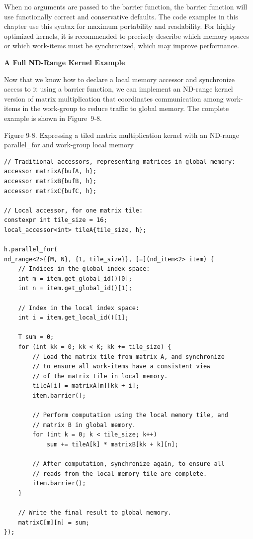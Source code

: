 When no arguments are passed to the barrier function, the barrier function will use functionally correct and conservative defaults. The code examples in this chapter use this syntax for maximum portability and readability. For highly optimized kernels, it is recommended to precisely describe which memory spaces or which work-items must be synchronized, which may improve performance.\par

\hspace*{\fill} \par %
\textbf{A Full ND-Range Kernel Example}

Now that we know how to declare a local memory accessor and synchronize access to it using a barrier function, we can implement an ND-range kernel version of matrix multiplication that coordinates communication among work-items in the work-group to reduce traffic to global memory. The complete example is shown in Figure 9-8.\par

\hspace*{\fill} \par %
Figure 9-8. Expressing a tiled matrix multiplication kernel with an ND-range parallel\_for and work-group local memory
\begin{lstlisting}[caption={}]
// Traditional accessors, representing matrices in global memory:
accessor matrixA{bufA, h};
accessor matrixB{bufB, h};
accessor matrixC{bufC, h};

// Local accessor, for one matrix tile:
constexpr int tile_size = 16;
local_accessor<int> tileA{tile_size, h};

h.parallel_for(
nd_range<2>{{M, N}, {1, tile_size}}, [=](nd_item<2> item) {
	// Indices in the global index space:
	int m = item.get_global_id()[0];
	int n = item.get_global_id()[1];
	
	// Index in the local index space:
	int i = item.get_local_id()[1];
	
	T sum = 0;
	for (int kk = 0; kk < K; kk += tile_size) {
		// Load the matrix tile from matrix A, and synchronize
		// to ensure all work-items have a consistent view
		// of the matrix tile in local memory.
		tileA[i] = matrixA[m][kk + i];
		item.barrier();
		
		// Perform computation using the local memory tile, and
		// matrix B in global memory.
		for (int k = 0; k < tile_size; k++)
			sum += tileA[k] * matrixB[kk + k][n];
		
		// After computation, synchronize again, to ensure all
		// reads from the local memory tile are complete.
		item.barrier();
	}

	// Write the final result to global memory.
	matrixC[m][n] = sum;
});
\end{lstlisting}

